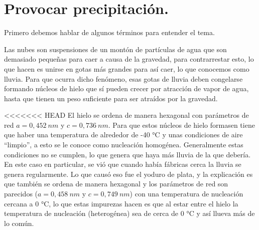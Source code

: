 \documentclass[12pt,a4paper]{article}
\begin{document}

\tableofcontents
\begin{abstract}
    Analice, investigue e interprete el contenido relacionado con los Casos de Estudio de la bibliografía que se indica a continuación a fin de efectuar una explicación detallada de los mismos. Adicionalmente, debe emplear Matlab y Python para estar en capacidad de determinar los efectos de la variación de los requerimientos iniciales y de los valores de las propiedades en el modelo de solución adoptado. [NOTA: Anualmente la Cátedra asignará los Casos de Estudio a cada equipo de trabajo].
    \begin{itemize}
        \item Software. \{MM-CAD-TP 1-03\}.
        \item Ashby, M.F. y Jones, D.R.H. Materiales para Ingeniería 2. 1ra Edición. 2009. Cap. 4 Casos prácticos de diagramas de fases (pp. 40-52) y Cap. 9 Casos prácticos de transformaciones de fase (pp. 107-118) \{MM-CAD-0.0.0\}.
        \item 9.2 Provocar lluvia (1*) [Caso 2025] Equipo 2.
    \end{itemize}
\end{abstract}
\section{Provocar precipitación.}
Primero debemos hablar de algunos términos para entender el tema.

Las nubes son suspensiones de un montón de partículas de agua que son demasiado pequeñas para caer a causa de la gravedad, para contrarrestar esto, lo que hacen es unirse en gotas más grandes para así caer, lo que conocemos como lluvia. Para que ocurra dicho fenómeno, esas gotas de lluvia deben congelarse formando núcleos de hielo que sí pueden crecer por atracción de vapor de agua, hasta que tienen un peso suficiente para ser atraídos por la gravedad.

<<<<<<< HEAD
El hielo se ordena de manera hexagonal con parámetros de red $a=0,452\:nm$ y $c=0,736\:nm$. Para que estos núcleos de hielo formasen tiene que haber una temperatura de alrededor de -40 °C y unas condiciones de aire \textquotedblleft{}limpio\textquotedblright{}, a esto se le conoce como nucleación homogénea. Generalmente estas condiciones no se cumplen, lo que genera que haya más lluvia de la que debería. En este caso en particular, se vió que cuando había fábricas cerca la lluvia se genera regularmente. Lo que causó eso fue el yoduro de plata, y la explicación es que también se ordena de manera hexagonal y los parámetros de red son parecidos ($a=0,458\:nm$ y $c=0,749\: nm$) con una temperatura de nucleación cercana a 0 °C, lo que estas impurezas hacen es que al estar entre el hielo la temperatura de nucleación (heterogénea) sea de cerca de 0 °C y así llueva más de lo común.
\end{document}
